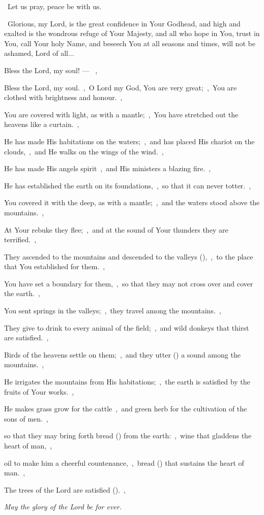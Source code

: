 \documentclass[12pt,twoside,a5paper]{article}
\begin{document}
\dd~Let us pray, peace be with us.

\cc~Glorious, my Lord, is the great confidence in Your Godhead, and high and exalted is the wondrous refuge of Your Majesty, and all who hope in You, trust in You, call Your holy Name, and beseech You at all seasons and times, will not be ashamed, Lord of all...

\begin{halfparskip}
   Bless the Lord, my soul! --- ~\sep

  Bless the Lord, my soul.~\sep\ O Lord my God, You are very great;~\sep\ You are clothed with brightness and honour.~\sep

  You are covered with light, as with a mantle;~\sep\ You have stretched out the heavens like a curtain.~\sep

  He has made His habitations on the waters;~\sep\ and has placed His chariot on the clouds,~\sep\ and He walks on the wings of the wind.~\sep

  He has made His angels spirit~\sep\ and His ministers a blazing fire.~\sep

  He has established the earth on its foundations,~\sep\ so that it can never totter.~\sep

  You covered it with the deep, as with a mantle;~\sep\ and the waters stood above the mountains.~\sep

  At Your rebuke they flee;~\sep\ and at the sound of Your thunders they are terrified.~\sep

  They ascended to the mountains and descended to the valleys (),~\sep\ to the place that You established for them.~\sep

  You have set a boundary for them,~\sep\ so that they may not cross over and cover the earth.~\sep

  You sent springs in the valleys;~\sep\ they travel among the mountains.~\sep

  They give to drink to every animal of the field;~\sep\ and wild donkeys that thirst are satisfied.~\sep

  Birds of the heavens settle on them;~\sep\ and they utter () a sound among the mountains.~\sep

  He irrigates the mountains from His habitations;~\sep\ the earth is satisfied by the fruits of Your works.~\sep

  He makes grass grow for the cattle~\sep\ and green herb for the cultivation of the sons of men.~\sep

  so that they may bring forth bread () from the earth:~\sep\ wine that gladdens the heart of man,~\sep

  oil to make him a cheerful countenance,~\sep\ bread () that sustains the heart of man.~\sep

  The trees of the Lord are satisfied ().~\sep

   \emph{May the glory of the Lord be for ever.}
\end{halfparskip}
\end{document}
